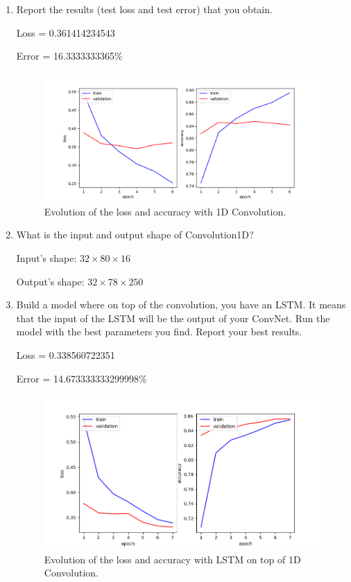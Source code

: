 \documentclass{article} %
\begin{document}
\begin{enumerate}
    \item
    Report the results (test loss and test error) that you obtain.

    Loss = 0.361414234543

    Error = 16.3333333365\%

    \begin{figure}[ht]
    \includegraphics[width=\textwidth,height=\textheight,keepaspectratio]{img/cnn_loss_acc.png}
    \caption{Evolution of the loss and accuracy with 1D Convolution.}
    \end{figure}

    \item
    What is the input and output shape of Convolution1D?

    Input's shape: $32 \times 80 \times 16$

    Output's shape: $32 \times 78 \times 250$

    \item
    Build a model where on top of the convolution, you have an LSTM. It means
    that the input of the LSTM will be the output of your ConvNet. Run the model
    with the best parameters you find. Report your best results.

    Loss = 0.338560722351

    Error = 14.673333333299998\%

    \begin{figure}[ht]
    \includegraphics[width=\textwidth,height=\textheight,keepaspectratio]{img/cnn_lstm_loss_acc.png}
    \caption{Evolution of the loss and accuracy with LSTM on top of 1D Convolution.}
    \end{figure}
\end{enumerate}
\end{document}
